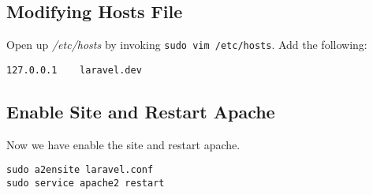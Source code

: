 \documentclass[a4paper, 12pt]{article}
\begin{document}
\subsection{Modifying Hosts File}
Open up \emph{/etc/hosts} by invoking \verb|sudo vim /etc/hosts|.
Add the following:
\begin{verbatim}
127.0.0.1    laravel.dev
\end{verbatim}
\subsection{Enable Site and Restart Apache}
Now we have enable the site and restart apache.
\begin{verbatim}
sudo a2ensite laravel.conf
sudo service apache2 restart
\end{verbatim}
\end{document}
